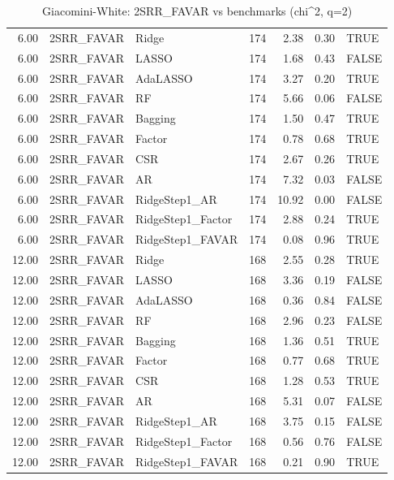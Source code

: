 \begin{table}[ht]
\begin{tabular}{rllrrrl}
  6.00 & 2SRR\_FAVAR & Ridge & 174 & 2.38 & 0.30 & TRUE \\ 
  6.00 & 2SRR\_FAVAR & LASSO & 174 & 1.68 & 0.43 & FALSE \\ 
  6.00 & 2SRR\_FAVAR & AdaLASSO & 174 & 3.27 & 0.20 & TRUE \\ 
  6.00 & 2SRR\_FAVAR & RF & 174 & 5.66 & 0.06 & FALSE \\ 
  6.00 & 2SRR\_FAVAR & Bagging & 174 & 1.50 & 0.47 & TRUE \\ 
  6.00 & 2SRR\_FAVAR & Factor & 174 & 0.78 & 0.68 & TRUE \\ 
  6.00 & 2SRR\_FAVAR & CSR & 174 & 2.67 & 0.26 & TRUE \\ 
  6.00 & 2SRR\_FAVAR & AR & 174 & 7.32 & 0.03 & FALSE \\ 
  6.00 & 2SRR\_FAVAR & RidgeStep1\_AR & 174 & 10.92 & 0.00 & FALSE \\ 
  6.00 & 2SRR\_FAVAR & RidgeStep1\_Factor & 174 & 2.88 & 0.24 & TRUE \\ 
  6.00 & 2SRR\_FAVAR & RidgeStep1\_FAVAR & 174 & 0.08 & 0.96 & TRUE \\ 
  12.00 & 2SRR\_FAVAR & Ridge & 168 & 2.55 & 0.28 & TRUE \\ 
  12.00 & 2SRR\_FAVAR & LASSO & 168 & 3.36 & 0.19 & FALSE \\ 
  12.00 & 2SRR\_FAVAR & AdaLASSO & 168 & 0.36 & 0.84 & FALSE \\ 
  12.00 & 2SRR\_FAVAR & RF & 168 & 2.96 & 0.23 & FALSE \\ 
  12.00 & 2SRR\_FAVAR & Bagging & 168 & 1.36 & 0.51 & TRUE \\ 
  12.00 & 2SRR\_FAVAR & Factor & 168 & 0.77 & 0.68 & TRUE \\ 
  12.00 & 2SRR\_FAVAR & CSR & 168 & 1.28 & 0.53 & TRUE \\ 
  12.00 & 2SRR\_FAVAR & AR & 168 & 5.31 & 0.07 & FALSE \\ 
  12.00 & 2SRR\_FAVAR & RidgeStep1\_AR & 168 & 3.75 & 0.15 & FALSE \\ 
  12.00 & 2SRR\_FAVAR & RidgeStep1\_Factor & 168 & 0.56 & 0.76 & FALSE \\ 
  12.00 & 2SRR\_FAVAR & RidgeStep1\_FAVAR & 168 & 0.21 & 0.90 & TRUE \\ 
   \hline
\end{tabular}
\caption{Giacomini-White: 2SRR_FAVAR vs benchmarks (chi^2, q=2)} 
\label{tab:gw}
\end{table}
